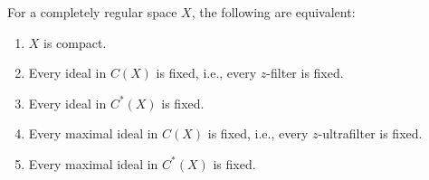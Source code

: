 For a completely regular space \(X\), the following are equivalent:

\begin{enumerate}
\item[(1)] \(X\) is compact.
\item[(2)] Every ideal in \(C(X)\) is fixed, i.e., every \(z\)-filter is fixed.
\item[(2^*)] Every ideal in \(C^*(X)\) is fixed.
\item[(3)] Every maximal ideal in \(C(X)\) is fixed, i.e., every \(z\)-ultrafilter is fixed.
\item[(3^*)] Every maximal ideal in \(C^*(X)\) is fixed.
\end{enumerate}
